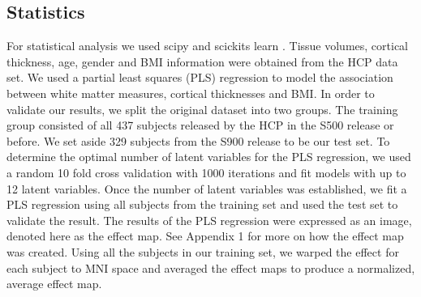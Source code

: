 \subsection{Statistics}
    For statistical analysis we used scipy and scickits learn \cite{jones2001open,Hill,Nelli_2015}. Tissue volumes, cortical thickness, age, gender and BMI information were obtained from the HCP data set. We used a partial least squares (PLS) regression \cite{leguina2015primer} to model the association between white matter measures, cortical thicknesses and BMI. In order to validate our results, we split the original dataset into two groups. The training group consisted of all 437 subjects released by the HCP in the S500 release or before. We set aside 329 subjects from the S900 release to be our test set. To determine the optimal number of latent variables for the PLS regression, we used a random 10 fold cross validation with 1000 iterations and fit models with up to 12 latent variables. Once the number of latent variables was established, we fit a PLS regression using all subjects from the training set and used the test set to validate the result. The results of the PLS regression were expressed as an image, denoted here as the effect map. See Appendix 1 for more on how the effect map was created. Using all the subjects in our training set, we warped the effect for each subject to MNI space and averaged the effect maps to produce a normalized, average effect map.
